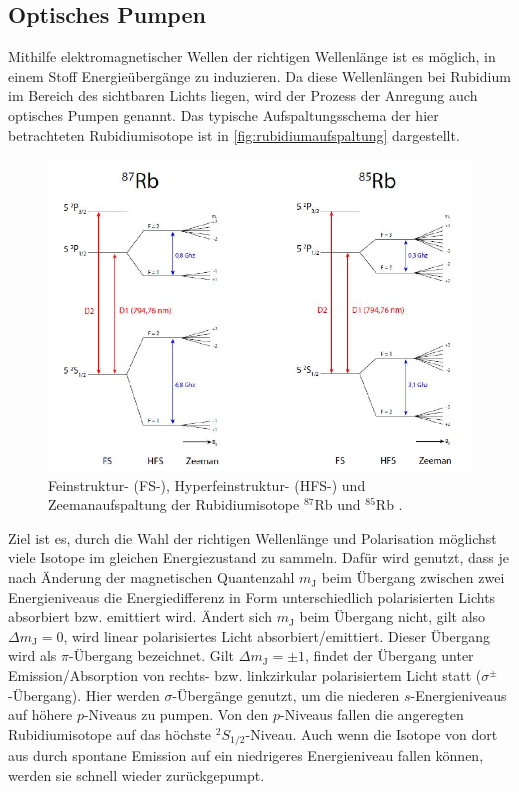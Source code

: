 \subsection{Optisches Pumpen}

Mithilfe elektromagnetischer Wellen der richtigen Wellenlänge ist es möglich, in einem Stoff Energieübergänge zu induzieren.
Da diese Wellenlängen bei Rubidium im Bereich des sichtbaren Lichts liegen, wird der Prozess der Anregung auch optisches Pumpen genannt.
Das typische Aufspaltungsschema der hier betrachteten Rubidiumisotope ist in \autoref{fig:rubidiumaufspaltung} dargestellt.
\begin{figure}[H]
    \centering
    \includegraphics{figures/AufspaltungRubidium.pdf}
    \caption{Feinstruktur- (FS-), Hyperfeinstruktur- (HFS-) und Zeemanaufspaltung der Rubidiumisotope $^{87}$Rb und $^{85}$Rb \cite{rubidiumspalt}.}
    \label{fig:rubidiumaufspaltung}
\end{figure}
Ziel ist es, durch die Wahl der richtigen Wellenlänge und Polarisation möglichst viele Isotope im gleichen Energiezustand zu sammeln.
Dafür wird genutzt, dass je nach Änderung der magnetischen Quantenzahl $m_\text{J}$ beim Übergang zwischen zwei Energieniveaus die Energiedifferenz in Form unterschiedlich polarisierten Lichts absorbiert bzw. emittiert wird.
Ändert sich $m_\text{J}$ beim Übergang nicht, gilt also $\Delta m_\text{J} = 0$, wird linear polarisiertes Licht absorbiert/emittiert.
Dieser Übergang wird als $\pi$-Übergang bezeichnet.
Gilt $\Delta m_\text{J} = \pm 1$, findet der Übergang unter Emission/Absorption von rechts- bzw. linkzirkular polarisiertem Licht statt ($\sigma^\pm$-Übergang).
Hier werden $\sigma$-Übergänge genutzt, um die niederen $s$-Energieniveaus auf höhere $p$-Niveaus zu pumpen.
Von den $p$-Niveaus fallen die angeregten Rubidiumisotope auf das höchste $^2S_{1/2}$-Niveau.
Auch wenn die Isotope von dort aus durch spontane Emission auf ein niedrigeres Energieniveau fallen können, werden sie schnell wieder zurückgepumpt. \\

